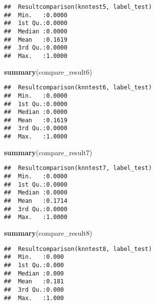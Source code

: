 \documentclass[]{article}
\newenvironment{Shaded}{\begin{snugshade}}{\end{snugshade}}
\newcommand{\KeywordTok}[1]{\textcolor[rgb]{0.13,0.29,0.53}{\textbf{#1}}}
\newcommand{\NormalTok}[1]{#1}
\begin{document}
\begin{verbatim}
##  Resultcomparison(knntest5, label_test)
##  Min.   :0.0000                        
##  1st Qu.:0.0000                        
##  Median :0.0000                        
##  Mean   :0.1619                        
##  3rd Qu.:0.0000                        
##  Max.   :1.0000
\end{verbatim}

\begin{Shaded}
\begin{Highlighting}[]
\KeywordTok{summary}\NormalTok{(compare_result6)}
\end{Highlighting}
\end{Shaded}

\begin{verbatim}
##  Resultcomparison(knntest6, label_test)
##  Min.   :0.0000                        
##  1st Qu.:0.0000                        
##  Median :0.0000                        
##  Mean   :0.1619                        
##  3rd Qu.:0.0000                        
##  Max.   :1.0000
\end{verbatim}

\begin{Shaded}
\begin{Highlighting}[]
\KeywordTok{summary}\NormalTok{(compare_result7)}
\end{Highlighting}
\end{Shaded}

\begin{verbatim}
##  Resultcomparison(knntest7, label_test)
##  Min.   :0.0000                        
##  1st Qu.:0.0000                        
##  Median :0.0000                        
##  Mean   :0.1714                        
##  3rd Qu.:0.0000                        
##  Max.   :1.0000
\end{verbatim}

\begin{Shaded}
\begin{Highlighting}[]
\KeywordTok{summary}\NormalTok{(compare_result8)}
\end{Highlighting}
\end{Shaded}

\begin{verbatim}
##  Resultcomparison(knntest8, label_test)
##  Min.   :0.000                         
##  1st Qu.:0.000                         
##  Median :0.000                         
##  Mean   :0.181                         
##  3rd Qu.:0.000                         
##  Max.   :1.000
\end{verbatim}
\end{document}
